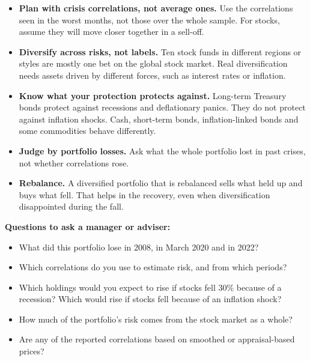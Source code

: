 \begin{itemize}
  \item \textbf{Plan with crisis correlations, not average ones.} Use the correlations seen in the worst months, not those over the whole sample. For stocks, assume they will move closer together in a sell-off.
  \item \textbf{Diversify across risks, not labels.} Ten stock funds in different regions or styles are mostly one bet on the global stock market. Real diversification needs assets driven by different forces, such as interest rates or inflation.
  \item \textbf{Know what your protection protects against.} Long-term Treasury bonds protect against recessions and deflationary panics. They do not protect against inflation shocks. Cash, short-term bonds, inflation-linked bonds and some commodities behave differently.
  \item \textbf{Judge by portfolio losses.} Ask what the whole portfolio lost in past crises, not whether correlations rose.
  \item \textbf{Rebalance.} A diversified portfolio that is rebalanced sells what held up and buys what fell. That helps in the recovery, even when diversification disappointed during the fall.
\end{itemize}

\textbf{Questions to ask a manager or adviser:}

\begin{itemize}
  \item What did this portfolio lose in 2008, in March 2020 and in 2022?
  \item Which correlations do you use to estimate risk, and from which periods?
  \item Which holdings would you expect to rise if stocks fell 30\% because of a recession? Which would rise if stocks fell because of an inflation shock?
  \item How much of the portfolio's risk comes from the stock market as a whole?
  \item Are any of the reported correlations based on smoothed or appraisal-based prices?
\end{itemize}

